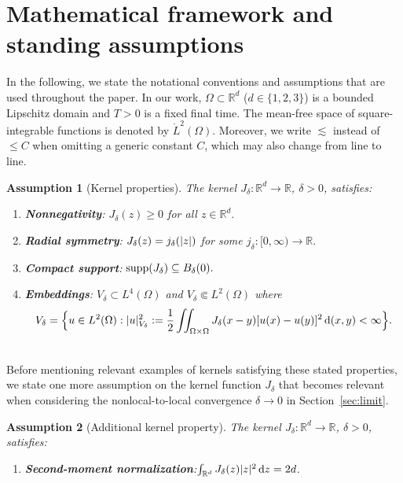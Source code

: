 \documentclass[]{article}
\newtheorem{assumption}{Assumption}
\newcommand{\dz}{\,\textup{d}z}
\newcommand{\dxy}{\,\textup{d}(x,y)}
\DeclarePairedDelimiter{\abs}{\lvert}{\rvert}
\begin{document}
\section{Mathematical framework and standing assumptions}
\label{sec:math-framework}
In the following, we state the notational conventions and assumptions that are used throughout the paper. In our work, \(\Omega\subset\mathbb{R}^d\) (\(d\in\{1,2,3\}\)) is a bounded Lipschitz domain and \(T>0\) is a fixed final time. The mean-free space of square-integrable functions is denoted by $\mathring{L}^2(\Omega)$. Moreover, we write $\lesssim$ instead of $\leq C$ when omitting a generic constant $C$, which may also change from line to line.
\begin{assumption}[Kernel properties]
	\label{assump:kernel}
	The kernel $J_\delta: \mathbb{R}^d \to \mathbb{R}$, $\delta>0$, satisfies:\\[-0.5em]
	\begin{enumerate}[label=\textup{(J\arabic*)}, ref=J\arabic*, leftmargin=.9cm] 
		\item \textbf{Nonnegativity}: $J_\delta(z) \geq 0$ for all $z \in \mathbb{R}^d.$ \label{assump:nonneg}
		\item \textbf{Radial symmetry}: $J_\delta(z) = j_\delta(\abs{z})$ for some $j_\delta: [0,\infty) \to \mathbb{R}.$
		\item \textbf{Compact support}: $\textup{supp}(J_\delta) \subseteq B_\delta(0).$
		\item \textbf{Embeddings}: \label{assump:comp}
		$V_\delta \subset L^4(\Omega)$ and $V_\delta \Subset L^2(\Omega)$ where 
		$$V_\delta = \Bigl\{ u \in L^2(\Omega) : 
		|u|_{{V_\delta}}^2 := \frac12 \iint_{\Omega \times \Omega} J_{\delta}(x-y) [u(x)-u(y)]^2  \dxy < \infty \Bigr\}.
		$$
	\end{enumerate}
\end{assumption}
\ \\
Before mentioning relevant examples of kernels satisfying these stated properties, we state one more assumption on the kernel function $J_\delta$ that becomes relevant when considering the nonlocal-to-local convergence $\delta \to 0$ in Section~\ref{sec:limit}.
\begin{assumption}[Additional kernel property]\label{assump:kernel2}
	The kernel $J_\delta: \mathbb{R}^d \to \mathbb{R}$, $\delta>0$, satisfies:\\[-0.5em]
	\begin{enumerate}[label=(J\arabic*), ref=J\arabic*, start=5, leftmargin=.9cm] 
		\item \textbf{Second-moment normalization}:$
		\int_{\mathbb{R}^d} J_\delta(z)\abs{z}^2  \dz = 2d$. \label{assump:2ndnorm}
	\end{enumerate}
\end{assumption}
\end{document}
